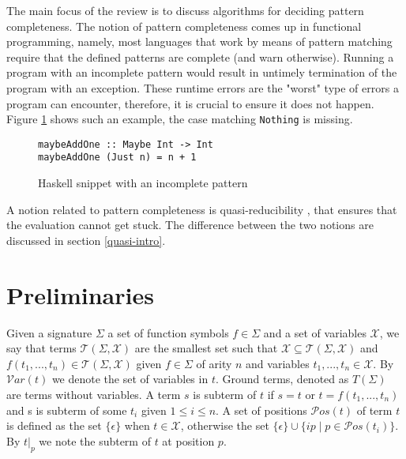The main focus of the review is to discuss algorithms for deciding pattern completeness. The notion of pattern completeness comes up in functional programming, namely, most languages that work by means of pattern matching require that the defined patterns are complete (and warn otherwise). Running a program with an incomplete pattern would result in untimely termination of the program with an exception. These runtime errors are the "worst" type of errors a program can encounter, therefore, it is crucial to ensure it does not happen. Figure \ref{fig:haskell-incomplete} shows such an example, the case matching \texttt{Nothing} is missing.

\begin{figure}[!ht]
\centering
\begin{verbatim}
maybeAddOne :: Maybe Int -> Int
maybeAddOne (Just n) = n + 1
\end{verbatim}
    \caption{Haskell snippet with an incomplete pattern}
    \label{fig:haskell-incomplete}
\end{figure}

A notion related to pattern completeness is quasi-reducibility \cite{kapur}, that ensures that the evaluation cannot get stuck. The difference between the two notions are discussed in section \ref{quasi-intro}.

\section{Preliminaries}
Given a signature $\Sigma$ a set of function symbols $f \in \Sigma$ and a set of variables $\mathcal{X}$, we say that terms $\mathcal{T}(\Sigma, \mathcal{X})$ are the smallest set such that $\mathcal{X} \subseteq \mathcal{T}(\Sigma, \mathcal{X})$ and $f(t_1, ..., t_n) \in \mathcal{T}(\Sigma, \mathcal{X})$ given $f \in \Sigma$ of arity $n$ and variables $t_1, ..., t_n \in \mathcal{X}$. By $\mathcal{V}ar(t)$ we denote the set of variables in $t$. Ground terms, denoted as $T(\Sigma)$ are terms without variables. A term $s$ is subterm of $t$ if $s = t$ or $t = f(t_1, ..., t_n)$ and s is subterm of some $t_i$ given $1 \leq i \leq n$. A set of positions $\mathcal{P}os(t)$ of term $t$ is defined as the set $\{\epsilon\}$ when $t \in \mathcal{X}$, otherwise the set $\{\epsilon\} \cup \{ip \mid p \in \mathcal{P}os(t_i)\}$. By $t|_p$ we note the subterm of $t$ at position $p$.


